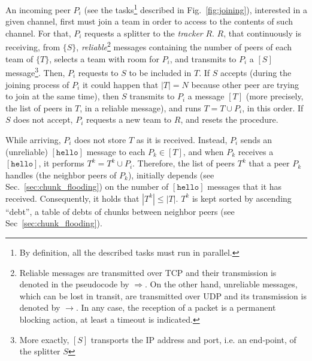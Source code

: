
\label{sec:peer_joining}
\begin{figure*}
   \caption{Tasks involved in a peer
    joining. $P_i$ is the incoming peer, and $P_k$ is a peer that is
    already in the team. $R$ represents the tracker, and $S$ the
    splitter of the team $T$ to which $P_k$ belongs, and $P_i$ will be
    added.\label{fig:joining}}
\end{figure*}
An incoming peer $P_i$ (see the tasks\footnote{By definition, all the
described tasks must run in parallel.} described in
Fig.~\ref{fig:joining}), interested in a given channel, first must
join a team in order to access to the contents of such channel. For
that, $P_i$ requests a splitter to the \emph{tracker} $R$. $R$, that
continuously is receiving, from $\{S\}$,
\emph{reliable}\footnote{Reliable messages are transmitted over TCP
  and their transmission is denoted in the pseudocode by
  $\Rightarrow$. On the other hand, unreliable messages, which can be
  lost in transit, are transmitted over UDP and its transmission is
  denoted by $\rightarrow$. In any case, the reception of a packet is
  a permanent blocking action, at least a timeout is indicated.}
messages containing the number of peers of each team of $\{T\}$,
selects a team with room for $P_i$, and transmits to $P_i$ a $[S]$
message\footnote{More exactly, $[S]$ transports the IP address and
  port, i.e. an end-point, of the splitter $S$}. Then, $P_i$ requests
to $S$ to be included in $T$. If $S$ accepts (during the joining
process of $P_i$ it could happen that $|T|=N$ because other peer are
trying to join at the same time), then $S$ transmits to $P_i$ a
message $[T]$ (more precisely, the list of peers in $T$, in a reliable
message), and runs $T = T \cup P_i$, in this order. If $S$ does not
accept, $P_i$ requests a new team to $R$, and resets the procedure.


While arriving, $P_i$ does not store $T$ as it is received. Instead,
$P_i$ sends an (unreliable) $[\mathtt{hello}]$ message to each $P_k\in
[T]$, and when $P_k$ receives a $[\mathtt{hello}]$, it performs $T^k =
T^k \cup P_i$. Therefore, the list of peers $T^k$ that a peer $P_k$
handles (the neighbor peers of $P_k$), initially depends (see
Sec.~\ref{sec:chunk_flooding}) on the number of $[\mathtt{hello}]$
messages that it has received. Consequently, it holds that $|T^k| \le
|T|$. $T^k$ is kept sorted by ascending ``debt'', a table of debts of
chunks between neighbor peers (see Sec~\ref{sec:chunk_flooding}).

